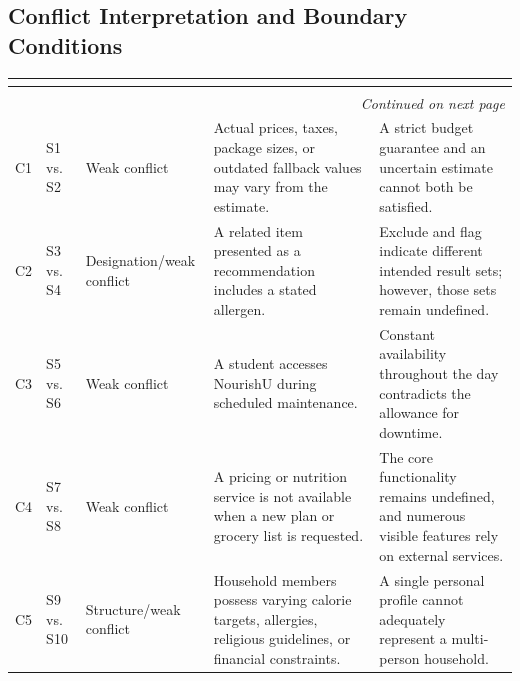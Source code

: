 \documentclass[11pt,a4paper]{article}
\renewcommand{\arraystretch}{1.15}
\begin{document}
\subsection{Conflict Interpretation and Boundary Conditions}

\begin{landscape}
\begin{center}
\scriptsize
\setlength{\tabcolsep}{2.5pt}
\renewcommand{\arraystretch}{1.18}
\begin{longtable}{|p{1.1cm}|p{2.0cm}|p{3.2cm}|p{8.0cm}|p{9.6cm}|}
\hline
\rowcolor{headerblue} \textbf{\color{white}{Conflict}} & \textbf{\color{white}{Statements}} & \textbf{\color{white}{Type}} & \textbf{\color{white}{Boundary condition}} & \textbf{\color{white}{Reason}} \\ \hline
\endfirsthead
\hline
\rowcolor{headerblue} \textbf{\color{white}{Conflict}} & \textbf{\color{white}{Statements}} & \textbf{\color{white}{Type}} & \textbf{\color{white}{Boundary condition}} & \textbf{\color{white}{Reason}} \\ \hline
\endhead
\hline
\multicolumn{5}{r}{\small\itshape Continued on next page}\\
\endfoot
\hline
\endlastfoot
C1 & S1 vs. S2 & Weak conflict & Actual prices, taxes, package sizes, or outdated fallback values may vary from the estimate. & A strict budget guarantee and an uncertain estimate cannot both be satisfied. \\ \hline
C2 & S3 vs. S4 & Designation/weak conflict & A related item presented as a recommendation includes a stated allergen. & Exclude and flag indicate different intended result sets; however, those sets remain undefined. \\ \hline
C3 & S5 vs. S6 & Weak conflict & A student accesses NourishU during scheduled maintenance. & Constant availability throughout the day contradicts the allowance for downtime. \\ \hline
C4 & S7 vs. S8 & Weak conflict & A pricing or nutrition service is not available when a new plan or grocery list is requested. & The core functionality remains undefined, and numerous visible features rely on external services. \\ \hline
C5 & S9 vs. S10 & Structure/weak conflict & Household members possess varying calorie targets, allergies, religious guidelines, or financial constraints. & A single personal profile cannot adequately represent a multi-person household. \\ \hline
\end{longtable}
\end{center}
\end{landscape}
\end{document}
